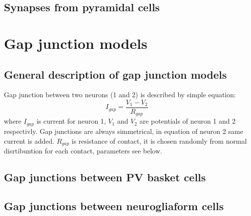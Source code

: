 \documentclass[a4paper,12pt]{article}
\begin{document}
\subsection{Synapses from pyramidal cells}












\section{Gap junction models} \label{gap_junctions_models}
\subsection{General description of gap junction models}
Gap junction between two neurons (1 and 2) is described by simple equation:
\begin{equation}
I_{gap} = \frac{V_{1} - V_{2}}{R_{gap}}
\end{equation}
where $I_{gap}$ is current for neuron 1, $V_{1}$ and $V_{2}$ are potentials of neuron 1 and 2 respectivly. Gap junctions are always simmetrical, in equation of neuron 2 same current is added. $R_{gap}$ is resistance of contact, it is chosen randomly from normal disrtibuntion for each contact, parameters see below.


\subsection{Gap junctions between PV basket cells}

\subsection{Gap junctions between neurogliaform cells}
\end{document}
